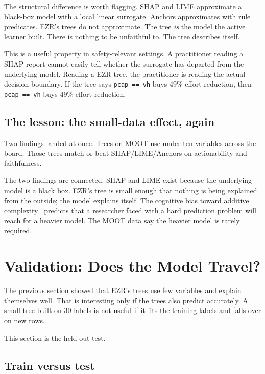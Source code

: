 \documentclass[AMA,STIX2COL]{WileyNJDv5}
\newcommand{\IT}{{\sffamily EZR}}
\begin{document}
The structural difference is worth flagging. SHAP and LIME
approximate a black-box model with a local linear surrogate.
Anchors approximates with rule predicates. \IT{}'s trees do not
approximate. The tree {\em is} the model the active learner
built. There is nothing to be unfaithful to. The tree describes
itself.

This is a useful property in safety-relevant settings. A
practitioner reading a SHAP report cannot easily tell whether
the surrogate has departed from the underlying model. Reading a
\IT{} tree, the practitioner is reading the actual decision
boundary. If the tree says \texttt{pcap == vh} buys 49\% effort
reduction, then \texttt{pcap == vh} buys 49\% effort reduction.

\subsection*{The lesson: the small-data effect, again}

Two findings landed at once. Trees on MOOT use under ten
variables across the board. Those trees match or beat
SHAP/LIME/Anchors on actionability and faithfulness.

The two findings are connected. SHAP and LIME exist because the
underlying model is a black box. \IT{}'s tree is small enough
that nothing is being explained from the outside; the model
explains itself. The cognitive bias toward additive
complexity~\cite{adams2021people} predicts that a researcher
faced with a hard prediction problem will reach for a heavier
model. The MOOT data say the heavier model is rarely required.


\section{Validation: Does the Model Travel?}\label{sec:valid}

The previous section showed that \IT{}'s trees use few
variables and explain themselves well. That is interesting only
if the trees also predict accurately. A small tree built on 30
labels is not useful if it fits the training labels and falls
over on new rows.

This section is the held-out test.

\subsection{Train versus test}
\end{document}
